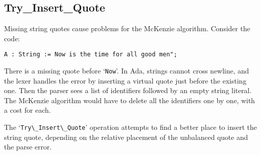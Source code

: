 \documentclass[authordraft]{acmart}
\newcommand{\code}[1]{`\lstinline|#1|'}
\begin{document}
\subsection{Try\_Insert\_Quote}
Missing string quotes cause problems for the McKenzie algorithm.
Consider the code:
\begin{lstlisting}
A : String := Now is the time for all good men";
\end{lstlisting}
There is a missing quote before \code{Now}. In Ada, strings cannot
cross newline, and the lexer handles the error by inserting a virtual
quote just before the existing one. Then the parser sees a list of
identifiers followed by an empty string literal. The McKenzie
algorithm would have to delete all the identifiers one by one, with a
cost for each.

The \code{Try\_Insert\_Quote} operation attempts to find a better
place to insert the string quote, depending on the relative placement
of the unbalanced quote and the parse error.
\end{document}
